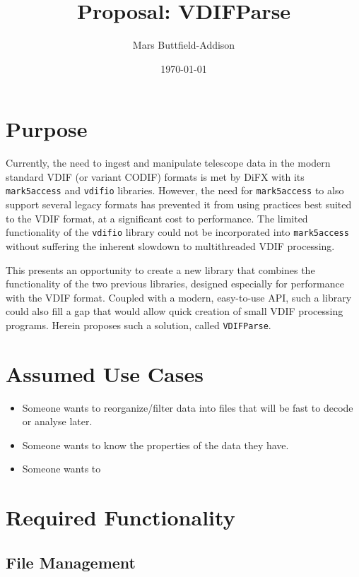 \documentclass[11pt]{article}
\title{Proposal: VDIFParse}
\author{Mars Buttfield-Addison}
\date{\today}
\begin{document}
\maketitle

\section{Purpose}

Currently, the need to ingest and manipulate telescope data in the modern standard VDIF (or variant CODIF) formats is met by DiFX with its \texttt{mark5access} and \texttt{vdifio} libraries. However, the need for \texttt{mark5access} to also support several legacy formats has prevented it from using practices best suited to the VDIF format, at a significant cost to performance. The limited functionality of the \texttt{vdifio} library could not be incorporated into \texttt{mark5access} without suffering the inherent slowdown to multithreaded VDIF processing.

This presents an opportunity to create a new library that combines the functionality of the two previous libraries, designed especially for performance with the VDIF format. Coupled with a modern, easy-to-use API, such a library could also fill a gap that would allow quick creation of small VDIF processing programs. Herein proposes such a solution, called \texttt{VDIFParse}.

\section{Assumed Use Cases}

\begin{itemize}
\item Someone wants to reorganize/filter data into files that will be fast to decode or analyse later.
\item Someone wants to know the properties of the data they have.
\item Someone wants to 	
\end{itemize}


\section{Required Functionality}

\subsection{File Management}
\end{document}
